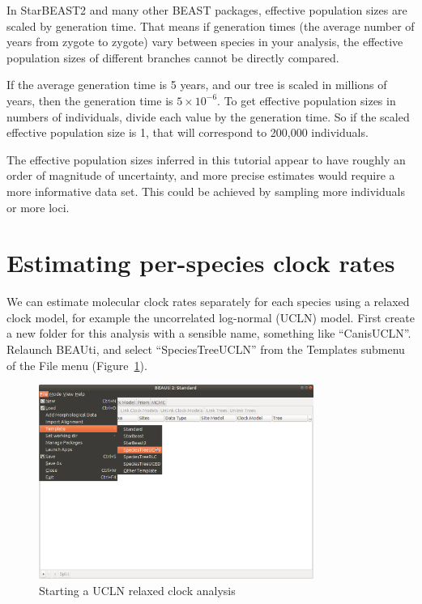 \documentclass[12pt]{article}
\begin{document}
In StarBEAST2 and many other BEAST packages, effective population sizes are
scaled by generation time. That means if generation times (the average
number of years from zygote to zygote) vary between species in your
analysis, the effective population sizes of different branches cannot be
directly compared.

If the average generation time is 5 years, and our tree is scaled in millions
of years, then the generation time is $5\times10^{-6}$. To get effective
population sizes in numbers of individuals, divide each value by the
generation time. So if the scaled effective population size is 1, that
will correspond to 200,000 individuals.

The effective population sizes inferred in this tutorial appear to have
roughly an order of magnitude of uncertainty, and more precise estimates would require
a more informative data set. This could be achieved by sampling more
individuals or more loci.

\section{Estimating per-species clock rates}
\label{sec:relaxedClock}

We can estimate molecular clock rates separately for each species using
a relaxed clock model, for example the uncorrelated log-normal (UCLN) model.
First create a new folder for this analysis with a sensible name, something
like ``CanisUCLN''. Relaunch BEAUti, and select ``SpeciesTreeUCLN'' from the
Templates submenu of the File menu (Figure~\ref{fig:speciesTreeUCLN}).

\begin{figure}[htb!]
\centering
\includegraphics[width=0.8\textwidth]{figures/speciesTreeUCLN.png}
\caption
{Starting a UCLN relaxed clock analysis}
\label{fig:speciesTreeUCLN}
\end{figure}
\end{document}
